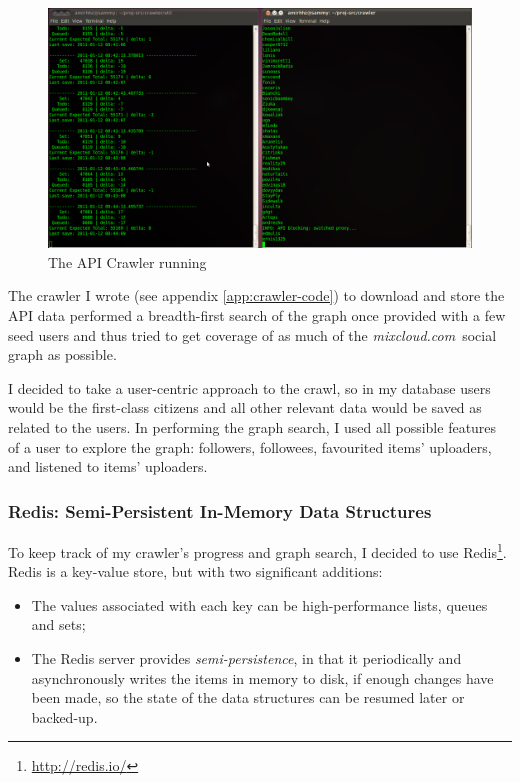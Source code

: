 \documentclass[a4paper,12pt,twoside,notitlepage]{report}
\def\mixurl{\emph{mixcloud.com}}
\begin{document}
\begin{figure}[h]
 \centering
 \includegraphics[width=\textwidth]{./images/running-scan.png}
 \caption{The API Crawler running}
 \label{fig:running-scan}
\end{figure}

The crawler I wrote (see appendix \ref{app:crawler-code}) to download and store
the API data performed a breadth-first search of the graph once provided with a
few seed users and thus tried to get coverage of as much of the \mixurl\ social
graph as possible.

I decided to take a user-centric approach to the crawl, so in my database users
would be the first-class citizens and all other relevant data would be saved as
related to the users. In performing the graph search, I used all possible
features of a user to explore the graph: followers, followees, favourited items'
uploaders, and listened to items' uploaders.

\subsubsection{Redis: Semi-Persistent In-Memory Data Structures}

To keep track of my crawler's progress and graph search, I decided to use
Redis\footnote{\url{http://redis.io/}}. Redis is a key-value store, but with two
significant additions:
\begin{itemize}
 \item The values associated with each key can be high-performance lists, queues
and sets;
 \item The Redis server provides \emph{semi-persistence}, in that it
periodically and asynchronously writes the items in memory to disk, if enough
changes have been made, so the state of the data structures can be resumed later
or backed-up.
\end{itemize} 
\end{document}
